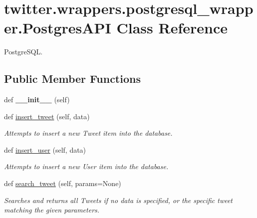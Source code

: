 \hypertarget{classtwitter_1_1wrappers_1_1postgresql__wrapper_1_1PostgresAPI}{}\section{twitter.\+wrappers.\+postgresql\+\_\+wrapper.\+Postgres\+A\+PI Class Reference}
\label{classtwitter_1_1wrappers_1_1postgresql__wrapper_1_1PostgresAPI}


Postgre\+S\+QL.  


\subsection*{Public Member Functions}
\begin{DoxyCompactItemize}
\item 
\mbox{\label{classtwitter_1_1wrappers_1_1postgresql__wrapper_1_1PostgresAPI_a18adcc26af89165719564d5f90d5baa2}} 
def {\bfseries \+\_\+\+\_\+init\+\_\+\+\_\+} (self)
\item 
def \hyperlink{classtwitter_1_1wrappers_1_1postgresql__wrapper_1_1PostgresAPI_a6b2b617a04ade9f12c63996210b2287b}{insert\+\_\+tweet} (self, data)
\begin{DoxyCompactList}\small\item\em Attempts to insert a new Tweet item into the database. \end{DoxyCompactList}\item 
def \hyperlink{classtwitter_1_1wrappers_1_1postgresql__wrapper_1_1PostgresAPI_ae94da23c6824c6db14d62624eee98325}{insert\+\_\+user} (self, data)
\begin{DoxyCompactList}\small\item\em Attempts to insert a new User item into the database. \end{DoxyCompactList}\item 
def \hyperlink{classtwitter_1_1wrappers_1_1postgresql__wrapper_1_1PostgresAPI_a772c1a47184e165cfe9958c78a97a146}{search\+\_\+tweet} (self, params=None)
\begin{DoxyCompactList}\small\item\em Searches and returns all Tweets if no data is specified, or the specific tweet matching the given parameters. \end{DoxyCompactList}\item 

\end{DoxyCompactItemize}
